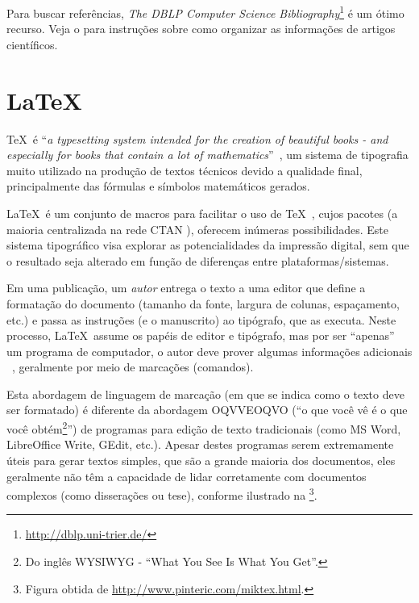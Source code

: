 Para buscar referências, \emph{The DBLP Computer Science Bibliography}\footnote{\url{http://dblp.uni-trier.de/}} é um ótimo recurso. Veja o  
para instruções sobre como organizar as informações de artigos científicos.



\section{\LaTeX}%

\TeX\ é ``\emph{a typesetting system intended for the creation of beautiful books
 - and especially for books that contain a lot of mathematics}''~\cite{Knuth_1986_texbook}, 
 um sistema de tipografia muito utilizado na produção de textos técnicos devido 
 a qualidade final, principalmente das fórmulas e símbolos matemáticos gerados.

\LaTeX\ é um conjunto de macros para facilitar o uso de \TeX~\cite{Lamport_1986_LaTeXDocumentPreparation}, 
cujos pacotes (a maioria centralizada na rede CTAN \cite{greenwade93}), oferecem 
inúmeras possibilidades. Este sistema tipográfico visa explorar as potencialidades 
da impressão digital, sem que o resultado seja alterado em função de diferenças 
entre plataformas/sistemas.

Em uma publicação, um \emph{autor} entrega o texto a uma editor que define a 
formatação do documento (tamanho da fonte, largura de colunas, espaçamento, etc.)
e passa as instruções (e o manuscrito) ao tipógrafo, que as executa. Neste processo,
\LaTeX\ assume os papéis de editor e tipógrafo, mas por ser ``apenas'' um programa 
de computador, o autor deve prover algumas informações adicionais ~\cite{Oetiker_1995_notsoshort},
geralmente por meio de marcações (comandos).

Esta abordagem de linguagem de marcação (em que se indica como o texto deve ser 
formatado) é diferente da abordagem OQVVEOQVO (``o que você vê é o que você 
obtém\footnote{Do inglês WYSIWYG - ``What You See Is What You Get''.}'') de programas 
para edição de texto tradicionais (como MS Word, LibreOffice Write, GEdit, etc.).
Apesar destes programas serem extremamente úteis para gerar textos simples, que 
são a grande maioria dos documentos, eles geralmente não têm a capacidade de lidar 
corretamente com documentos complexos (como disserações ou tese), conforme ilustrado 
na \footnote{Figura obtida de \url{http://www.pinteric.com/miktex.html}.}.

